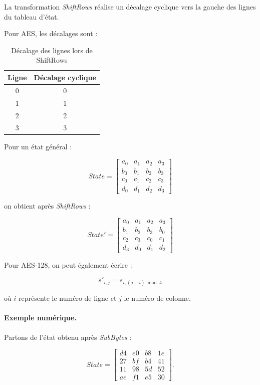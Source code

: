 \documentclass[12pt,a4paper]{article}
\begin{document}
La transformation \textit{ShiftRows} réalise un décalage cyclique
vers la gauche des lignes du tableau d'état.

Pour AES, les décalages sont :

\begin{table}[H]
\centering
\caption{Décalage des lignes lors de ShiftRows}
\begin{tabular}{|c|c|}
\hline
\textbf{Ligne} & \textbf{Décalage cyclique}\\
\hline
0 & 0\\
\hline
1 & 1\\
\hline
2 & 2\\
\hline
3 & 3\\
\hline
\end{tabular}
\end{table}

Pour un état général :

\[
State=
\begin{bmatrix}
a_0&a_1&a_2&a_3\\
b_0&b_1&b_2&b_3\\
c_0&c_1&c_2&c_3\\
d_0&d_1&d_2&d_3
\end{bmatrix}
\]

on obtient après \textit{ShiftRows} :

\[
\boxed{
State'=
\begin{bmatrix}
a_0&a_1&a_2&a_3\\
b_1&b_2&b_3&b_0\\
c_2&c_3&c_0&c_1\\
d_3&d_0&d_1&d_2
\end{bmatrix}
}
\]

Pour AES-128, on peut également écrire :

\[
\boxed{
s'_{i,j}=s_{i,(j+i)\bmod4}
}
\]

où $i$ représente le numéro de ligne et $j$ le numéro de colonne.



\paragraph{Exemple numérique.}

Partons de l'état obtenu après \textit{SubBytes} :

\[
State=
\begin{bmatrix}
d4&e0&b8&1e\\
27&bf&b4&41\\
11&98&5d&52\\
ae&f1&e5&30
\end{bmatrix}.
\]
\end{document}

